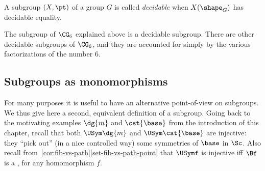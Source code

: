 \begin{definition}\label{def:decidable-subgroup}
  A subgroup $(X,\pt)$ of a group $G$ is called
  \emph{decidable} when $X(\sh_G)$ has decidable
  equality.
\end{definition}

The subgroup of $\CG_6$ explained above is a decidable subgroup. There are other
decidable subgroups of $\CG_6$, and they are accounted for simply by the various
factorizations of the number $6$.

\subsection{Subgroups as monomorphisms}\label{sec:subgroups-mono}




For many purposes it is useful to have an alternative point-of-view on
subgroups.  We thus give here a second, equivalent definition of a
subgroup. Going back to the motivating examples $\dg{m}$ and $\cst{\base}$ from
the introduction of this chapter, recall that both $\USym\dg{m}$ and
$\USym\cst{\base}$ are injective: they ``pick out'' (in a nice controlled way)
some symmetries of $\base$ in $\Sc$.  Also recall
from~\cref{cor:fib-vs-path}\ref{set-fib-vs-path-point} that $\USymf$ is
injective iff $\Bf$ is a \covering, for any homomorphism $f$.

